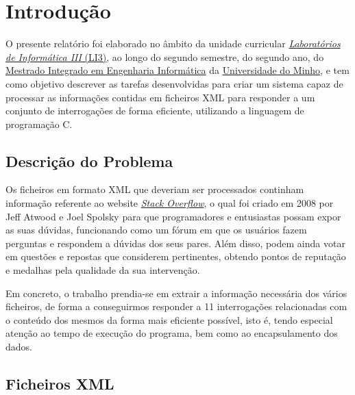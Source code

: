 \documentclass[a4paper]{article}
\begin{document}
\tableofcontents


\pagebreak

\section{Introdução}
\label{sec:intro}

O presente relatório foi elaborado no âmbito da unidade curricular
\href{http://miei.di.uminho.pt/plano_estudos.html#laborat_rios_de_inform_tica_iii}
{\emph {Laboratórios de Informática III} (LI3)}, ao longo do segundo semestre,
do segundo ano, do \href{http://miei.di.uminho.pt}{Mestrado Integrado em Engenharia Informática}
da \href{https://www.uminho.pt}{Universidade do Minho}, e tem como objetivo
descrever as tarefas desenvolvidas para criar um sistema capaz de processar as
informações contidas em ficheiros XML para responder a um conjunto de
interrogações de forma eficiente, utilizando a linguagem de programação C.


\subsection{Descrição do Problema}
\label{sec:problema}

Os ficheiros em formato XML que deveriam ser processados continham informação referente ao
website \href{https://stackoverflow.com/}{\textit{Stack Overflow}}, o qual foi
criado em 2008 por Jeff Atwood e Joel Spolsky para que programadores e
entusiastas possam expor as suas dúvidas, funcionando como um fórum em que os usuários fazem
perguntas e respondem a dúvidas dos seus pares. Além disso, podem ainda votar
em questões e repostas que considerem pertinentes, obtendo pontos de reputação
e medalhas pela qualidade da sua intervenção.

Em concreto, o trabalho prendia-se em extrair a informação necessária dos vários
ficheiros, de forma a conseguirmos responder a 11 interrogações relacionadas com
o conteúdo dos mesmos da forma mais eficiente possível, isto é, tendo especial
atenção ao tempo de execução do programa, bem como ao encapsulamento dos dados.

\subsection{Ficheiros XML}
\label{sec:xml}
\end{document}
